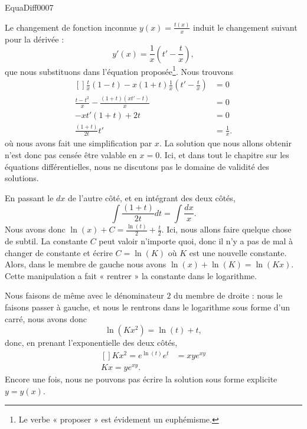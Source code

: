 \begin{corrige}{EquaDiff0007}

Le changement de fonction inconnue $y(x)=\frac{ t(x) }{ x }$ induit le changement suivant pour la dérivée :
\begin{equation}
	y'(x)=\frac{1}{ x }\left( t'-\frac{ t }{ x } \right),
\end{equation}
que nous substituons dans l'équation proposée\footnote{Le verbe « proposer » est évidement un euphémisme.}. Nous trouvons
\begin{equation}
	\begin{aligned}[]
		\frac{ t }{ x }(1-t)-x(1+t)\frac{1}{ x }\left( t'-\frac{ t }{ x } \right)&=0\\
		\frac{ t-t^2 }{ x }-\frac{ (1+t)(xt'-t) }{ x }&=0\\
		-xt'(1+t)+2t&=0\\
		\frac{ (1+t) }{ 2t }t'&=\frac{1}{ x }.
	\end{aligned}
\end{equation}
où nous avons fait une simplification par $x$. La solution que nous allons obtenir n'est donc pas censée être valable en $x=0$. Ici, et dans tout le chapitre sur les équations différentielles, nous ne discutons pas le domaine de validité des solutions.

En passant le $dx$ de l'autre côté, et en intégrant des deux côtés,
\begin{equation}
	\int\frac{ (1+t) }{ 2t }dt=\int \frac{ dx }{ x }.
\end{equation}
Nous avons donc $\ln(x)+C=\frac{ \ln(t) }{ 2 }+\frac{ t }{2}$. Ici, nous allons faire quelque chose de subtil. La constante $C$ peut valoir n'importe quoi, donc il n'y a pas de mal à changer de constante et écrire $C=\ln(K)$ où $K$ est une nouvelle constante. Alors, dans le membre de gauche nous avons $\ln(x)+\ln(K)=\ln(Kx)$. Cette manipulation a fait « rentrer » la constante dans le logarithme.

Nous faisons de même avec le dénominateur $2$ du membre de droite : nous le faisons passer à gauche, et nous le rentrons dans le logarithme sous forme d'un carré, nous avons donc
\begin{equation}
	\ln(Kx^2)= \ln(t)+t,
\end{equation}
donc, en prenant l'exponentielle des deux côtés,
\begin{equation}
	\begin{aligned}[]
		Kx^2= e^{\ln(t)} e^{t}&=xye^{xy}\\
		Kx=y e^{xy}.
	\end{aligned}
\end{equation}
Encore une fois, nous ne pouvons pas écrire la solution sous forme explicite $y=y(x)$.

\end{corrige}
